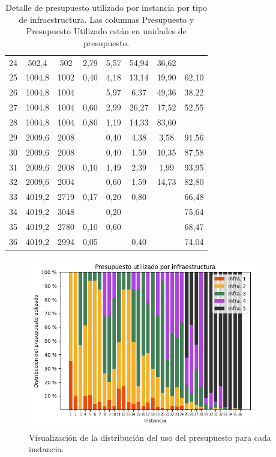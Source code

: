 \documentclass{article}
\begin{document}
\begin{table}
\begin{tabular}{cccccccc}
        24 & 502,4 & 502 & 2,79 & 5,57 & 54,94 & 36,62 &  \\
        25 & 1004,8 & 1002 & 0,40 & 4,18 & 13,14 & 19,90 & 62,10 \\
        26 & 1004,8 & 1004 &  & 5,97 & 6,37 & 49,36 & 38,22 \\
        27 & 1004,8 & 1004 & 0,60 & 2,99 & 26,27 & 17,52 & 52,55 \\
        28 & 1004,8 & 1004 & 0,80 & 1,19 & 14,33 & 83,60 &  \\
        29 & 2009,6 & 2008 &  & 0,40 & 4,38 & 3,58 & 91,56 \\
        30 & 2009,6 & 2008 &  & 0,40 & 1,59 & 10,35 & 87,58 \\
        31 & 2009,6 & 2008 & 0,10 & 1,49 & 2,39 & 1,99 & 93,95 \\
        32 & 2009,6 & 2004 &  & 0,60 & 1,59 & 14,73 & 82,80 \\
        33 & 4019,2 & 2719 & 0,17 & 0,20 & 0,80 &  & 66,48 \\
        34 & 4019,2 & 3048 &  & 0,20 &  &  & 75,64 \\
        35 & 4019,2 & 2780 & 0,10 & 0,60 &  &  & 68,47 \\
        36 & 4019,2 & 2994 & 0,05 &  & 0,40 &  & 74,04 \\
        \bottomrule
    \end{tabular}
      \caption{Detalle de presupuesto utilizado por instancia por tipo de infraestructura. Las columnas Presupuesto y Presupuesto Utilizado están en unidades de presupuesto.} \label{table:sensibilitybudgetusage}
  \end{table}

  \begin{figure}[h!]
    \centering
    \includegraphics[width=10cm]{../resources/budget_use_by_infra.png}
      \caption{Visualización de la distribución del uso del presupuesto para cada instancia.}
    \label{fig:sensibilitybudgetusage}
  \end{figure}
\end{document}
